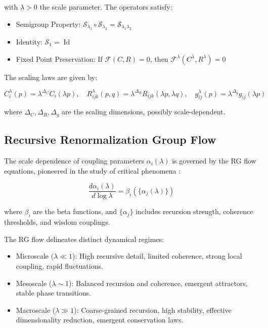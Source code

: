 with \(\lambda > 0\) the scale parameter. The operators satisfy:

\begin{itemize}
    \item Semigroup Property: \(\mathcal{S}_{\lambda_1} \circ \mathcal{S}_{\lambda_2} = \mathcal{S}_{\lambda_1 \lambda_2}\)
    \item Identity: \(\mathcal{S}_1 = \operatorname{Id}\)
    \item Fixed Point Preservation: If \(\mathcal{F}(C, R) = 0\), then \(\mathcal{F}^\lambda(C^\lambda, R^\lambda) = 0\)
\end{itemize}

The scaling laws are given by:

\begin{equation}
C_i^\lambda(p) = \lambda^{\Delta_C} C_i(\lambda p), \quad
R_{ijk}^\lambda(p, q) = \lambda^{\Delta_R} R_{ijk}(\lambda p, \lambda q), \quad
g_{ij}^\lambda(p) = \lambda^{\Delta_g} g_{ij}(\lambda p)
\end{equation}

where \(\Delta_C, \Delta_R, \Delta_g\) are the scaling dimensions, possibly scale-dependent.

\subsection{Recursive Renormalization Group Flow}

The scale dependence of coupling parameters \(\alpha_i(\lambda)\) is governed by the RG flow equations, pioneered in the study of critical phenomena \autocite{Wilson1971}:

\begin{equation}
\frac{d\alpha_i(\lambda)}{d\log\lambda} = \beta_i(\{\alpha_j(\lambda)\})
\end{equation}

where \(\beta_i\) are the beta functions, and \(\{\alpha_j\}\) includes recursion strength, coherence thresholds, and wisdom couplings.

The RG flow delineates distinct dynamical regimes:

\begin{itemize}
    \item Microscale (\(\lambda \ll 1\)): High recursive detail, limited coherence, strong local coupling, rapid fluctuations.
    \item Mesoscale (\(\lambda \sim 1\)): Balanced recursion and coherence, emergent attractors, stable phase transitions.
    \item Macroscale (\(\lambda \gg 1\)): Coarse-grained recursion, high stability, effective dimensionality reduction, emergent conservation laws.
\end{itemize}

